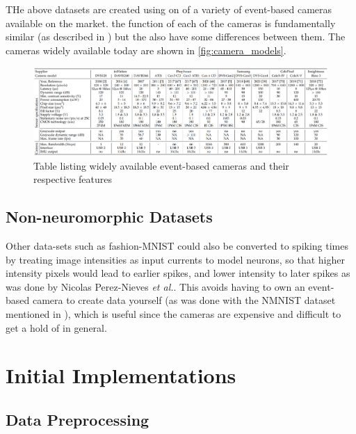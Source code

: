 THe above datasets are created using on of a variety of event-based cameras available on the market. the function of each of the cameras is fundamentally similar (as described in ) but the also have some differences between them. The cameras widely available today are shown in \autoref{fig:camera_models}.

\begin{figure}[htb]
      \centering
      \includegraphics[width=\textwidth]{background/images/camera_models.png}
      \caption{Table listing widely available event-based cameras and their respective features\cite{EventBasedVisionASurvery}}
      \label{fig:camera_models}
\end{figure}

\subsection{Non-neuromorphic Datasets}

Other data-sets such as fashion-MNIST could also be converted to spiking times by treating image intensities as input currents to model neurons, so that higher intensity pixels would lead to earlier spikes, and lower intensity to later spikes as was done by Nicolas Perez-Nieves \textit{et al.}\cite{NeuralHetroPromRobLearn}. This avoids having to own an event-based camera to create data yourself (as was done with the NMNIST dataset mentioned in ), which is useful since the cameras are expensive and difficult to get a hold of in general.

\section{Initial Implementations}

\subsection{Data Preprocessing}


